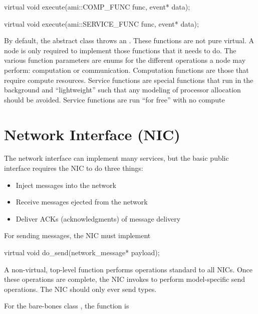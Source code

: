 \begin{CppCode}
virtual void execute(ami::COMP_FUNC func, event* data);

virtual void execute(ami::SERVICE_FUNC func, event* data);
\end{CppCode}	

By default, the abstract \nodecls class throws an . These functions are not pure virtual.
A node is only required to implement those functions that it needs to do.
The various function parameters are enums for the different operations a node may perform:
computation or communication. Computation functions are those that require compute resources. Service functions are special functions that run in the background and ``lightweight'' such that any modeling of processor allocation should be avoided. Service functions are run ``for free'' with no compute 

\section{Network Interface (NIC)}\label{sec:nic}
The network interface can implement many services, but the basic public interface requires the NIC to do three things:

\begin{itemize}
\item Inject messages into the network
\item Receive messages ejected from the network
\item Deliver ACKs (acknowledgments) of message delivery
\end{itemize}

For sending messages, the NIC must implement

\begin{CppCode}
  virtual void do_send(network_message* payload);
\end{CppCode}
A non-virtual, top-level  function performs operations standard to all NICs.
Once these operations are complete, the NIC invokes  to perform model-specific send operations.
The NIC should only ever send  types.

For the bare-bones class , the function is

